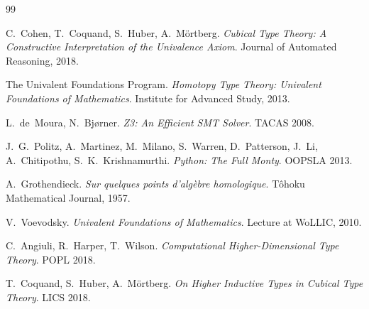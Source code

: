 \documentclass[11pt,a4paper]{report}
\theoremstyle{definition}
\theoremstyle{plain}
\begin{document}
\begin{thebibliography}{99}

C.~Cohen, T.~Coquand, S.~Huber, A.~M\"ortberg.
\emph{Cubical Type Theory: A Constructive Interpretation of the
  Univalence Axiom}.
Journal of Automated Reasoning, 2018.

The Univalent Foundations Program.
\emph{Homotopy Type Theory: Univalent Foundations of Mathematics}.
Institute for Advanced Study, 2013.

L.~de~Moura, N.~Bj{\o}rner.
\emph{Z3: An Efficient SMT Solver}.
TACAS 2008.

J.~G.~Politz, A.~Martinez, M.~Milano, S.~Warren, D.~Patterson,
J.~Li, A.~Chitipothu, S.~K.~Krishnamurthi.
\emph{Python: The Full Monty}.
OOPSLA 2013.

A.~Grothendieck.
\emph{Sur quelques points d'alg\`ebre homologique}.
T\^ohoku Mathematical Journal, 1957.

V.~Voevodsky.
\emph{Univalent Foundations of Mathematics}.
Lecture at WoLLIC, 2010.

C.~Angiuli, R.~Harper, T.~Wilson.
\emph{Computational Higher-Dimensional Type Theory}.
POPL 2018.

T.~Coquand, S.~Huber, A.~M\"ortberg.
\emph{On Higher Inductive Types in Cubical Type Theory}.
LICS 2018.

\end{thebibliography}
\end{document}
